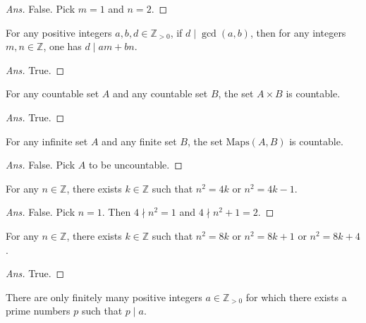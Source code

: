 \documentclass[12pt]{article}
\newenvironment{problem}[2][Problem]{\begin{trivlist}
\item[\hskip \labelsep {\bfseries #1}\hskip \labelsep {\bfseries #2.}]}{\end{trivlist}}
\begin{document}
\begin{proof}[Ans]
False. Pick $m = 1$ and $n = 2$.
\end{proof}

\begin{problem}{29}
For any positive integers $a, b, d \in \mathbb{Z}_{>0}$,
if $d \mid \gcd(a, b)$, then for any integers $m, n \in \mathbb{Z}$, one has $d \mid am+bn$.
\end{problem}

\begin{proof}[Ans]
True.
\end{proof}

\begin{problem}{30}
For any countable set $A$ and any countable set $B$,
the set $A \times B$ is countable.
\end{problem}

\begin{proof}[Ans]
True.
\end{proof}

\begin{problem}{31}
For any infinite set $A$ and any finite set $B$, the set $\text{Maps}(A, B)$ is countable.
\end{problem}

\begin{proof}[Ans]
False. Pick $A$ to be uncountable.
\end{proof}

\begin{problem}{32}
For any $n \in \mathbb{Z}$, there exists $ k \in \mathbb{Z}$ such that $n^2=4k$ or $n^2=4k-1$.
\end{problem}

\begin{proof}[Ans]
False. Pick $n = 1$. Then $ 4 \nmid n^2 = 1$ and $4 \nmid n^2 + 1 = 2$.
\end{proof}

\begin{problem}{33}
For any $n \in \mathbb{Z}$, there exists $k \in \mathbb{Z}$ such that $n^2=8k$ or $n^2=8k+1$ or $n^2=8k+4$. 
\end{problem}

\begin{proof}[Ans]
True.
\end{proof}

\begin{problem}{34}
There are only finitely many positive integers $a \in \mathbb{Z}_{>0} $ for which there exists a prime numbers $p$ such that $p \mid a$.
\end{problem}
\end{document}
